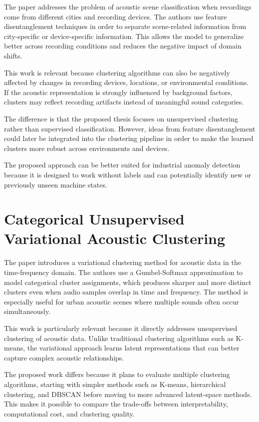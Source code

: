 \documentclass[runningheads,a4paper,11pt]{report}
\begin{document}
The paper \cite{acousticsceneclassification} addresses the problem of acoustic scene classification when recordings come from different cities and recording devices. The authors use feature disentanglement techniques in order to separate scene-related information from city-specific or device-specific information. This allows the model to generalize better across recording conditions and reduces the negative impact of domain shifts.

This work is relevant because clustering algorithms can also be negatively affected by changes in recording devices, locations, or environmental conditions. If the acoustic representation is strongly influenced by background factors, clusters may reflect recording artifacts instead of meaningful sound categories.

The difference is that the proposed thesis focuses on unsupervised clustering rather than supervised classification. However, ideas from feature disentanglement could later be integrated into the clustering pipeline in order to make the learned clusters more robust across environments and devices.

The proposed approach can be better suited for industrial anomaly detection because it is designed to work without labels and can potentially identify new or previously unseen machine states.

\section{Categorical Unsupervised Variational Acoustic Clustering}

The paper \cite{categoricalunsupervisedvariationalacousticclustering} introduces a variational clustering method for acoustic data in the time-frequency domain. The authors use a Gumbel-Softmax approximation to model categorical cluster assignments, which produces sharper and more distinct clusters even when audio samples overlap in time and frequency. The method is especially useful for urban acoustic scenes where multiple sounds often occur simultaneously.

This work is particularly relevant because it directly addresses unsupervised clustering of acoustic data. Unlike traditional clustering algorithms such as K-means, the variational approach learns latent representations that can better capture complex acoustic relationships.

The proposed work differs because it plans to evaluate multiple clustering algorithms, starting with simpler methods such as K-means, hierarchical clustering, and DBSCAN before moving to more advanced latent-space methods. This makes it possible to compare the trade-offs between interpretability, computational cost, and clustering quality.
\end{document}
